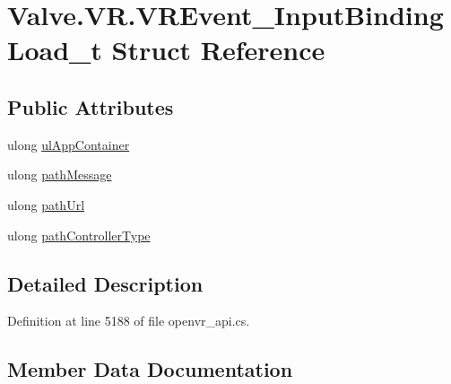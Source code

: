 \hypertarget{struct_valve_1_1_v_r_1_1_v_r_event___input_binding_load__t}{}\section{Valve.\+V\+R.\+V\+R\+Event\+\_\+\+Input\+Binding\+Load\+\_\+t Struct Reference}
\label{struct_valve_1_1_v_r_1_1_v_r_event___input_binding_load__t}
\subsection*{Public Attributes}
\begin{DoxyCompactItemize}
\item 
ulong \mbox{\hyperlink{struct_valve_1_1_v_r_1_1_v_r_event___input_binding_load__t_abe8411359d2415b71462e14c13ee46ff}{ul\+App\+Container}}
\item 
ulong \mbox{\hyperlink{struct_valve_1_1_v_r_1_1_v_r_event___input_binding_load__t_a249777ada4db69150200cc575b395449}{path\+Message}}
\item 
ulong \mbox{\hyperlink{struct_valve_1_1_v_r_1_1_v_r_event___input_binding_load__t_a326b123266cbeb4fefbae4daadf4ab16}{path\+Url}}
\item 
ulong \mbox{\hyperlink{struct_valve_1_1_v_r_1_1_v_r_event___input_binding_load__t_ae4e9bb13e49ed6f97fa3e48f65e47ec0}{path\+Controller\+Type}}
\end{DoxyCompactItemize}


\subsection{Detailed Description}


Definition at line 5188 of file openvr\+\_\+api.\+cs.



\subsection{Member Data Documentation}
\mbox{\label{struct_valve_1_1_v_r_1_1_v_r_event___input_binding_load__t_ae4e9bb13e49ed6f97fa3e48f65e47ec0}} 
